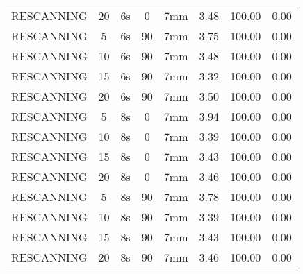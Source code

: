 \begin{table}[H]
\begin{tabular}{|c|c||c|c|c||c|c|c|}
RESCANNING & 20 & 6s & 0 & 7mm & 3.48 & 100.00 & 0.00 \\
RESCANNING & 5 & 6s & 90 & 7mm & 3.75 & 100.00 & 0.00 \\
RESCANNING & 10 & 6s & 90 & 7mm & 3.48 & 100.00 & 0.00 \\
RESCANNING & 15 & 6s & 90 & 7mm & 3.32 & 100.00 & 0.00 \\
RESCANNING & 20 & 6s & 90 & 7mm & 3.50 & 100.00 & 0.00 \\
RESCANNING & 5 & 8s & 0 & 7mm & 3.94 & 100.00 & 0.00 \\
RESCANNING & 10 & 8s & 0 & 7mm & 3.39 & 100.00 & 0.00 \\
RESCANNING & 15 & 8s & 0 & 7mm & 3.43 & 100.00 & 0.00 \\
RESCANNING & 20 & 8s & 0 & 7mm & 3.46 & 100.00 & 0.00 \\
RESCANNING & 5 & 8s & 90 & 7mm & 3.78 & 100.00 & 0.00 \\
RESCANNING & 10 & 8s & 90 & 7mm & 3.39 & 100.00 & 0.00 \\
RESCANNING & 15 & 8s & 90 & 7mm & 3.43 & 100.00 & 0.00 \\
RESCANNING & 20 & 8s & 90 & 7mm & 3.46 & 100.00 & 0.00 \\
    \hline\hline 
  \end{tabular}
\end{table}



